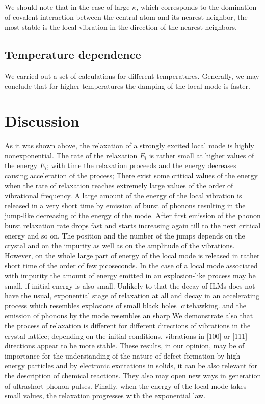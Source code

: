 We should note that in the case of large $\kappa$, which corresponds to the
domination of covalent interaction between the central atom and its
nearest neighbor, the most stable is the local vibration in the
direction of the nearest neighbors.

\subsection{Temperature dependence}
We carried out a set of calculations for different temperatures. Generally,
we may conclude that for higher temperatures the damping of the local
mode is faster.

\section{Discussion}
As it was shown above, the relaxation of a strongly excited local mode is
highly nonexponential. The rate of the relaxation $\dot{E}_l$ is rather 
small at higher
values of the energy $E_{l}$; with time the relaxation proceeds and the 
energy decreases causing acceleration of the process;
There exist some critical values of the energy 
when the rate of relaxation reaches
extremely large values of the order of vibrational frequency. A large
amount of the energy of the local
vibration is released in a very short time by emission of burst of phonons
resulting in the jump-like decreasing of the energy of the mode. 
After first emission of the phonon burst relaxation rate drops fast 
and starts increasing again till to the next critical energy and so on.
The position and the number of the jumps depends on the crystal and on the 
impurity as well as on the amplitude of the vibrations. 
However, on the whole large part of energy of the local mode is 
released in rather short time of the order of few picoseconds.
In the case of a local mode associated with impurity the amount of energy
emitted in an explosion-like process may be small, if initial energy is also 
small. Unlikely to that the  decay of ILMs does not have the usual, 
exponential stage of relaxation at all and decay in an accelerating
process which resembles explosions of small black holes |cite{hawking}.  
and the emission of phonons by the mode resembles an sharp 
We demonstrate also that the process of relaxation is different for different 
directions of vibrations in the crystal lattice; depending on 
the initial conditions, vibrations in [100] or [111] directions appear to be 
more stable. These results, in our opinion, may be of importance for the 
understanding of the nature of defect formation by high-energy particles and 
by electronic excitations in solids, it can be also relevant for the 
description of chemical reactions. They also may open new ways in generation 
of ultrashort phonon  pulses. Finally, when the energy of the local mode takes
small values, the relaxation progresses with the exponential law.


